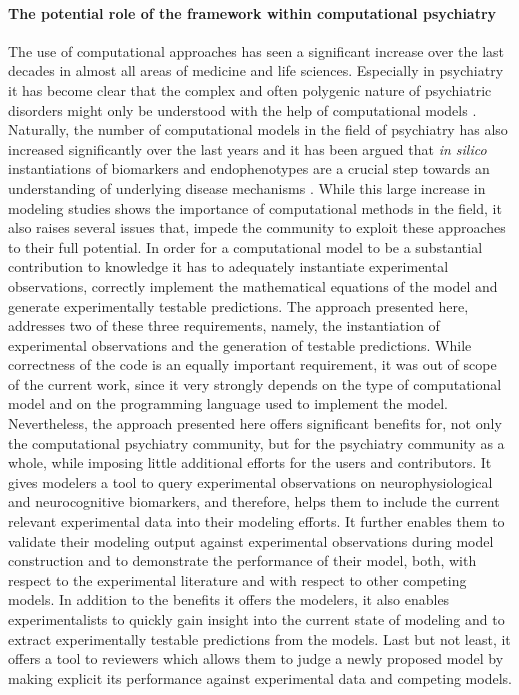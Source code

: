\documentclass[CompPsych]{stjour}
\begin{document}
\paragraph{The potential role of the framework within computational psychiatry}
The use of computational approaches has seen a significant increase over the last decades in almost all areas of medicine and life sciences. Especially in psychiatry it has 
become clear that the complex and often polygenic nature of psychiatric disorders might only be understood with the help of computational models \cite{Adams2016,Wang2014,Friston2014,Corlett2014,Stephan2014,
Montague2012,Siekmeier2015}.
Naturally, the number of computational models in the field of psychiatry has also increased significantly over the last years and it has been argued that 
\textit{in silico} instantiations of biomarkers and endophenotypes are a crucial step towards an understanding of underlying disease mechanisms \cite{Siekmeier2015}. While this large increase in 
modeling studies shows the importance of computational methods in the field, it also raises several issues that, impede the community to exploit these 
approaches to their full potential. In order for a computational model to be a substantial contribution to knowledge it has to adequately instantiate experimental observations,
correctly implement the mathematical equations of the model and generate experimentally testable predictions. The approach presented here, addresses two of these three requirements, namely, 
the instantiation of experimental observations and the generation of testable predictions. While correctness of the code is an equally important requirement, it was out of scope of the
current work, since it very strongly depends on the type of computational model and on the programming language used to implement the model. Nevertheless, the
approach  presented here offers significant benefits for, not only the computational psychiatry community, but for the psychiatry community as a whole, while imposing little additional efforts
for the users and contributors. It gives modelers a tool to query experimental observations on neurophysiological and neurocognitive biomarkers, and therefore, helps them to
include the current relevant experimental data into their modeling efforts. It further enables them to validate their modeling output against experimental observations during model construction
and to demonstrate the performance of their model, both, with respect to the experimental literature and with respect to other competing models. In addition to the benefits it offers
the modelers, it also enables experimentalists to quickly gain insight into the current state of modeling and to extract experimentally testable predictions from the models. Last but not least,
it offers a tool to reviewers which allows them to judge a newly proposed model by making explicit its performance against experimental data and competing models.
\end{document}
